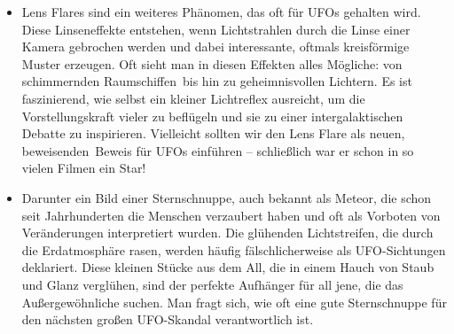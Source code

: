 \documentclass{scrartcl}
\begin{document}
\begin{itemize}
		 
	\item Lens Flares sind ein weiteres Phänomen, das oft für UFOs gehalten wird. Diese Linseneffekte entstehen, wenn Lichtstrahlen durch die Linse einer Kamera gebrochen werden und dabei interessante, oftmals kreisförmige Muster erzeugen. Oft sieht man in diesen Effekten alles Mögliche: von schimmernden \frq Raumschiffen\flq\ bis hin zu geheimnisvollen \flq Lichtern\frq. Es ist faszinierend, wie selbst ein kleiner Lichtreflex ausreicht, um die Vorstellungskraft vieler zu beflügeln und sie zu einer intergalaktischen Debatte zu inspirieren. Vielleicht sollten wir den Lens Flare als neuen, \frq beweisenden\flq\ Beweis für UFOs einführen – schließlich war er schon in so vielen Filmen ein Star! 
	\item Darunter ein Bild einer Sternschnuppe, auch bekannt als Meteor, die schon seit Jahrhunderten die Menschen verzaubert haben und oft als Vorboten von Veränderungen interpretiert wurden. Die glühenden Lichtstreifen, die durch die Erdatmosphäre rasen, werden häufig fälschlicherweise als UFO-Sichtungen deklariert. Diese kleinen Stücke aus dem All, die in einem Hauch von Staub und Glanz verglühen, sind der perfekte Aufhänger für all jene, die das Außergewöhnliche suchen. Man fragt sich, wie oft eine gute Sternschnuppe für den nächsten großen UFO-Skandal verantwortlich ist. 
\end{itemize}
\end{document}
